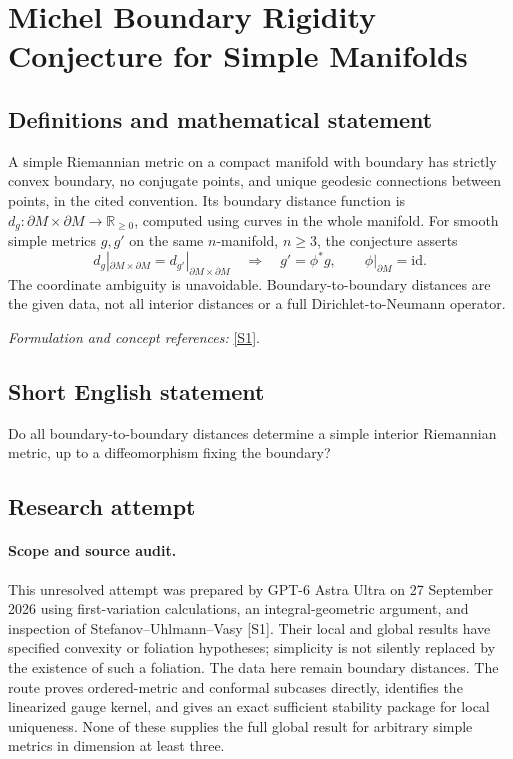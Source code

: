 \documentclass[11pt]{article}
\begin{document}
\section*{\texorpdfstring{Michel Boundary Rigidity Conjecture for Simple Manifolds}{Michel Boundary Rigidity Conjecture for Simple Manifolds}}\label{statement}
\subsection{Definitions and mathematical statement}
A simple Riemannian metric on a compact manifold with boundary has strictly convex boundary, no conjugate points, and unique geodesic connections between points, in the cited convention. Its boundary distance function is
$d_g:\partial M\times\partial M\to{\mathbb{R}}_{\ge0}$, computed using curves in the whole manifold. For smooth simple metrics $g,g'$ on the same $n$-manifold, $n\ge3$, the conjecture asserts
\[
 d_g|_{\partial M\times\partial M}=d_{g'}|_{\partial M\times\partial M}
 \quad\Longrightarrow\quad g'=\phi^*g,
 \qquad\phi|_{\partial M}=\mathrm{id}.
\]
The coordinate ambiguity is unavoidable. Boundary-to-boundary distances are the given data, not all interior distances or a full Dirichlet-to-Neumann operator.
\par\smallskip\textit{Formulation and concept references:} \href{https://arxiv.org/pdf/1702.03638v3}{[S1]}.

\subsection{Short English statement}
Do all boundary-to-boundary distances determine a simple interior Riemannian metric, up to a diffeomorphism fixing the boundary?
\subsection{Research attempt}
\paragraph{Scope and source audit.}
This unresolved attempt was prepared by GPT-6 Astra Ultra on 27 September
2026 using first-variation calculations, an integral-geometric argument,
and inspection of Stefanov--Uhlmann--Vasy [S1]. Their local and global
results have specified convexity or foliation hypotheses; simplicity is
not silently replaced by the existence of such a foliation. The data
here remain boundary distances. The route proves ordered-metric and
conformal subcases directly, identifies the linearized gauge kernel,
and gives an exact sufficient stability package for local uniqueness.
None of these supplies the full global result for arbitrary simple
metrics in dimension at least three.
\end{document}
